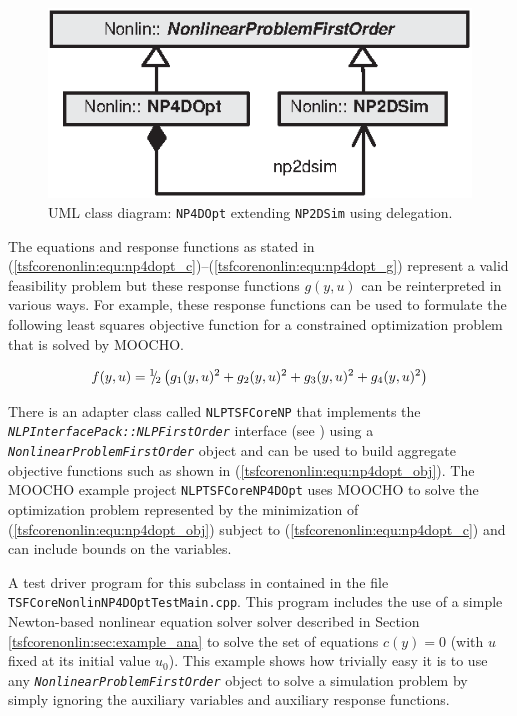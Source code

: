 %
{\bsinglespace
\begin{figure}
\begin{center}
\includegraphics*[bb= 0.0in 0.0in 2.6in 1.2in,angle=0,scale=0.70
]{NP4DOpt}
\end{center}
\caption{
\label{tsfcorenonlin:fig:NP4DOpt}
UML \cite{ref:booch_et_al_1999} class diagram: \texttt{NP4DOpt} extending
\texttt{NP2DSim} using delegation.
}
\end{figure}
\esinglespace}
%

The equations and response functions as stated in
(\ref{tsfcorenonlin:equ:np4dopt_c})--(\ref{tsfcorenonlin:equ:np4dopt_g})
represent a valid feasibility problem but these response functions
$g(y,u)$ can be reinterpreted in various ways.  For example, these
response functions can be used to formulate the following least
squares objective function for a constrained optimization problem that
is solved by MOOCHO.

\begin{equation}
f(y,u) = {}^1 \!\! / \! {}_2 \left( g_1(y,u)^2 + g_2(y,u)^2 + g_3(y,u)^2 + g_4(y,u)^2 \right)
\label{tsfcorenonlin:equ:np4dopt_obj}
\end{equation}

There is an adapter class called \texttt{NLPTSFCoreNP} that implements
the
\texttt{\textit{NLP\-Interface\-Pack\-::NLP\-First\-Order}} interface
(see \cite{ref:moochouserguide}) using a
\texttt{\textit{Nonlinear\-Problem\-First\-Order}} object and can be
used to build aggregate objective functions such as shown in
(\ref{tsfcorenonlin:equ:np4dopt_obj}).  The MOOCHO example project
\texttt{NLP\-TSFCore\-NP\-4D\-Opt} uses MOOCHO to solve the
optimization problem represented by the minimization of
(\ref{tsfcorenonlin:equ:np4dopt_obj}) subject to
(\ref{tsfcorenonlin:equ:np4dopt_c}) and can include bounds on the
variables.

A test driver program for this subclass in contained in the file
\texttt{TSFCore\-Nonlin\-NP4DOpt\-Test\-Main.cpp}.  This program
includes the use of a simple Newton-based nonlinear equation solver
solver described in Section \ref{tsfcorenonlin:sec:example_ana} to
solve the set of equations $c(y)=0$ (with $u$ fixed at its initial
value $u_0$).  This example shows how trivially easy it is to use any
\texttt{\textit{Nonlinear\-Problem\-First\-Order}} object to solve a
simulation problem by simply ignoring the auxiliary variables and
auxiliary response functions.

